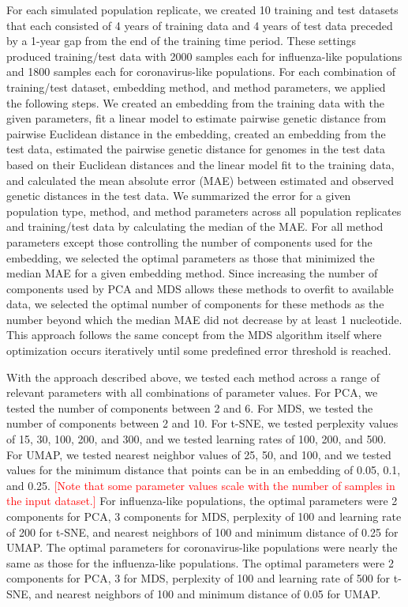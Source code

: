 \documentclass[10pt,letterpaper]{article}
\def\jhc#1{\textcolor{red}{[#1]}}
\begin{document}
For each simulated population replicate, we created 10 training and test datasets that each consisted of 4 years of training data and 4 years of test data preceded by a 1-year gap from the end of the training time period.
These settings produced training/test data with 2000 samples each for influenza-like populations and 1800 samples each for coronavirus-like populations.
For each combination of training/test dataset, embedding method, and method parameters, we applied the following steps.
We created an embedding from the training data with the given parameters, fit a linear model to estimate pairwise genetic distance from pairwise Euclidean distance in the embedding, created an embedding from the test data, estimated the pairwise genetic distance for genomes in the test data based on their Euclidean distances and the linear model fit to the training data, and calculated the mean absolute error (MAE) between estimated and observed genetic distances in the test data.
We summarized the error for a given population type, method, and method parameters across all population replicates and training/test data by calculating the median of the MAE.
For all method parameters except those controlling the number of components used for the embedding, we selected the optimal parameters as those that minimized the median MAE for a given embedding method.
Since increasing the number of components used by PCA and MDS allows these methods to overfit to available data, we selected the optimal number of components for these methods as the number beyond which the median MAE did not decrease by at least 1 nucleotide.
This approach follows the same concept from the MDS algorithm itself where optimization occurs iteratively until some predefined error threshold is reached.

With the approach described above, we tested each method across a range of relevant parameters with all combinations of parameter values.
For PCA, we tested the number of components between 2 and 6.
For MDS, we tested the number of components between 2 and 10.
For t-SNE, we tested perplexity values of 15, 30, 100, 200, and 300, and we tested learning rates of 100, 200, and 500.
For UMAP, we tested nearest neighbor values of 25, 50, and 100, and we tested values for the minimum distance that points can be in an embedding of 0.05, 0.1, and 0.25.
\jhc{Note that some parameter values scale with the number of samples in the input dataset.}
For influenza-like populations, the optimal parameters were 2 components for PCA, 3 components for MDS, perplexity of 100 and learning rate of 200 for t-SNE, and nearest neighbors of 100 and minimum distance of 0.25 for UMAP.
The optimal parameters for coronavirus-like populations were nearly the same as those for the influenza-like populations.
The optimal parameters were 2 components for PCA, 3 for MDS, perplexity of 100 and learning rate of 500 for t-SNE, and nearest neighbors of 100 and minimum distance of 0.05 for UMAP.
\end{document}
